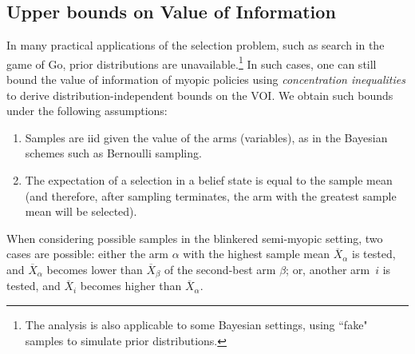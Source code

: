 \subsection{Upper bounds on Value of Information}\label{approx-nonbayesian-section}


In many practical applications of the selection problem, such as search in
the game of Go, prior distributions are unavailable.\footnote{The analysis is also applicable to
some Bayesian settings, using ``fake" samples to simulate prior distributions.}
In such cases, one can still bound
the value of information of myopic policies using {\em concentration
inequalities} to derive distribution-independent bounds on the
VOI. We obtain such bounds under the
following assumptions:
\begin{enumerate}
\item Samples are iid given the value of the arms (variables), as in the Bayesian schemes such as Bernoulli
sampling.
\item The expectation of a selection in a belief state is equal to the sample mean (and therefore,
   after sampling terminates, the arm with the greatest sample mean will be selected).
\end{enumerate}

When considering possible samples in the blinkered semi-myopic setting,
two cases are possible: either
	the arm $\alpha$ with the highest sample mean $\overline
  	X_\alpha$ is tested, and $\overline X_\alpha$ becomes lower than
 	$\overline X_\beta$ of the second-best arm $\beta$;
or, 
	another arm~$i$ is tested, and $\overline X_i$ becomes higher
    than $\overline X_\alpha$.


